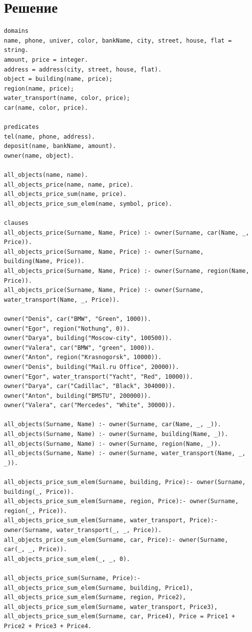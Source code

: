 \documentclass[12pt]{report}
\begin{document}
\chapter*{Решение}
\begin{lstlisting}
domains
name, phone, univer, color, bankName, city, street, house, flat = string.
amount, price = integer.
address = address(city, street, house, flat).
object = building(name, price);
region(name, price);
water_transport(name, color, price);
car(name, color, price).

predicates
tel(name, phone, address).
deposit(name, bankName, amount).
owner(name, object).

all_objects(name, name).
all_objects_price(name, name, price).
all_objects_price_sum(name, price).
all_objects_price_sum_elem(name, symbol, price).

clauses
all_objects_price(Surname, Name, Price) :- owner(Surname, car(Name, _, Price)).
all_objects_price(Surname, Name, Price) :- owner(Surname, building(Name, Price)).
all_objects_price(Surname, Name, Price) :- owner(Surname, region(Name, Price)).
all_objects_price(Surname, Name, Price) :- owner(Surname, water_transport(Name, _, Price)).

owner("Denis", car("BMW", "Green", 1000)).
owner("Egor", region("Nothung", 0)).
owner("Darya", building("Moscow-city", 100500)).
owner("Valera", car("BMW", "green", 1000)).
owner("Anton", region("Krasnogorsk", 10000)).
owner("Denis", building("Mail.ru Office", 20000)).
owner("Egor", water_transport("Yacht", "Red", 10000)).
owner("Darya", car("Cadillac", "Black", 304000)).
owner("Anton", building("BMSTU", 200000)).
owner("Valera", car("Mercedes", "White", 30000)).

all_objects(Surname, Name) :- owner(Surname, car(Name, _, _)).
all_objects(Surname, Name) :- owner(Surname, building(Name, _)).
all_objects(Surname, Name) :- owner(Surname, region(Name, _)).
all_objects(Surname, Name) :- owner(Surname, water_transport(Name, _, _)).

all_objects_price_sum_elem(Surname, building, Price):- owner(Surname, building(_, Price)).
all_objects_price_sum_elem(Surname, region, Price):- owner(Surname, region(_, Price)).
all_objects_price_sum_elem(Surname, water_transport, Price):- owner(Surname, water_transport(_, _, Price)).
all_objects_price_sum_elem(Surname, car, Price):- owner(Surname, car(_, _, Price)).
all_objects_price_sum_elem(_, _, 0).

all_objects_price_sum(Surname, Price):- all_objects_price_sum_elem(Surname, building, Price1), all_objects_price_sum_elem(Surname, region, Price2),
all_objects_price_sum_elem(Surname, water_transport, Price3), all_objects_price_sum_elem(Surname, car, Price4), Price = Price1 + Price2 + Price3 + Price4.


\end{lstlisting}
\end{document}
